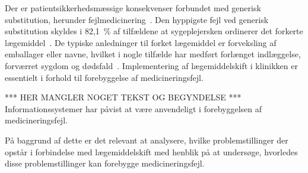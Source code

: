 Der er patientsikkerhedsmæssige konsekvenser forbundet med generisk substitution, herunder fejlmedicinering~\citep{Hakonsen2010}. %
Den hyppigste fejl ved generisk substitution skyldes i 82,1~\% af tilfældene at sygeplejersken ordinerer det forkerte lægemiddel~\citep{Hakonsen2010}. De typiske anledninger til forket lægemiddel er forveksling af emballager eller navne, hvilket i nogle tilfælde har medført forlænget indlæggelse, forværret sygdom og dødsfald~\citep{DanskSelskabforPatientsikkerhed2009}. Implementering af lægemiddelskift i klinikken er essentielt i forhold til forebyggelse af medicineringsfejl.

*** HER MANGLER NOGET TEKST OG BEGYNDELSE ***
Informationssystemer har påvist at være anvendeligt i forebyggelsen af medicineringsfejl.


På baggrund af dette er det relevant at analysere, hvilke problemstillinger der opstår
i forbindelse med lægemiddelskift med henblik på at undersøge, hvorledes disse
problemstillinger kan forebygge medicineringsfejl. 


